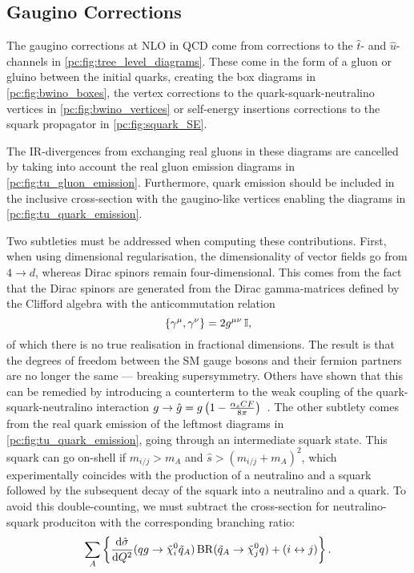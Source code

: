 \documentclass[../main.tex]{subfiles}
\begin{document}
\subsection{Gaugino Corrections}
The gaugino corrections at NLO in QCD come from corrections to the \(\hat{t}\)- and \(\hat{u}\)-channels in \cref{pc:fig:tree_level_diagrams}.
These come in the form of a gluon or gluino between the initial quarks, creating the box diagrams in \cref{pc:fig:bwino_boxes}, the vertex corrections to the quark-squark-neutralino vertices in \cref{pc:fig:bwino_vertices} or self-energy insertions corrections to the squark propagator in \cref{pc:fig:squark_SE}.

The IR-divergences from exchanging real gluons in these diagrams are cancelled by taking into account the real gluon emission diagrams in \cref{pc:fig:tu_gluon_emission}. Furthermore, quark emission should be included in the inclusive cross-section with the gaugino-like vertices enabling the diagrams in \cref{pc:fig:tu_quark_emission}.
\medskip

Two subtleties must be addressed when computing these contributions.
First, when using dimensional regularisation, the dimensionality of vector fields go from \(4 \to d\), whereas Dirac spinors remain four-dimensional.
This comes from the fact that the Dirac spinors are generated from the Dirac gamma-matrices defined by the Clifford algebra with the anticommutation relation
\begin{equation}
  \cclosed{\gamma\^\mu, \gamma\^\nu} = 2\g \eye,
\end{equation}
of which there is no true realisation in fractional dimensions.
The result is that the degrees of freedom between the SM gauge bosons and their fermion partners are no longer the same --- breaking supersymmetry.
Others have shown that this can be remedied by introducing a counterterm to the weak coupling of the quark-squark-neutralino interaction \(g \to \hat{g} = g\pclosed{1 - \frac{\alpha_s CF}{8\pi}}\)~\cite{Aguilar-Saavedra:2005zyz}.
The other subtlety comes from the real quark emission of the leftmost diagrams in \cref{pc:fig:tu_quark_emission}, going through an intermediate squark state.
This squark can go on-shell if \(m_{i/j} > m_A\) and \(\hat{s} > (m_{i/j} + m_A)^2\), which experimentally coincides with the production of a neutralino and a squark followed by the subsequent decay of the squark into a neutralino and a quark.
To avoid this double-counting, we must subtract the cross-section for neutralino-squark produciton with the corresponding branching ratio:
\begin{equation}
  \sum_A \cclosed{\d[Q^2]{\hat\sigma}(qg \to \tilde\chi^0_i \tilde{q}_A) \operatorname{BR}(\tilde{q}_A \to \tilde\chi^0_j q) + (i \leftrightarrow j)}.
\end{equation}
\end{document}
